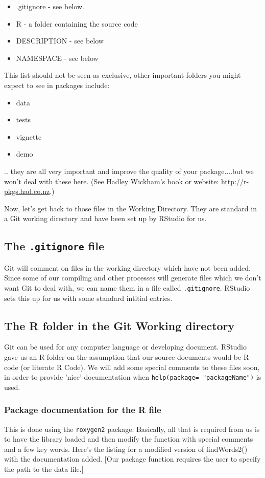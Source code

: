 \documentclass[titlepage]{book}\usepackage{knitr}
\begin{document}
\begin{itemize}
\item{.gitignore - see below.}
\item{R - a folder containing the source code}
\item{DESCRIPTION - see below}
\item{NAMESPACE - see below}
\end{itemize}

This list should not be seen as exclusive, other important folders you might expect to see in packages include:

\begin{itemize}
\item{data}
\item{tests}
\item{vignette}
\item{demo}
\end{itemize}

.. they are all very important and improve the quality of your package....but we won't deal with these here. (See Hadley Wickham's book \cite{Wickham2015b} or website: \href{http://r-pkgs.had.co.nz/}{http://r-pkgs.had.co.nz}.)


Now, let's get back to those files in the Working Directory. They are standard in a Git working directory and have been set up by RStudio for us.

\subsection{The \texttt{.gitignore} file}
Git will comment on files in the working directory which have not been added.  Since some of our compiling and other processes will generate files which we don't want Git to deal with, we can name them in a file called \texttt{.gitignore}. RStudio sets this up for us with some standard intitial entries.

\subsection{The R folder in the Git Working directory}
Git can be used for any computer language or developing document.  RStudio gave us an R folder on the assumption that our source documents would be R code (or literate R Code). We will add some special comments to these files soon, in order to provide 'nice' documentation when \texttt{help(package= "packageName")} is used.

\subsubsection{Package documentation for the R file}
This is done using the \texttt{roxygen2} package.  Basically, all that is required from us is to have the library loaded and then  modify the function with special comments and a few key words. Here's the listing for a modified version of findWords2() with the documentation added. [Our package function requires the user to specify the path to the data file.]
\end{document}
